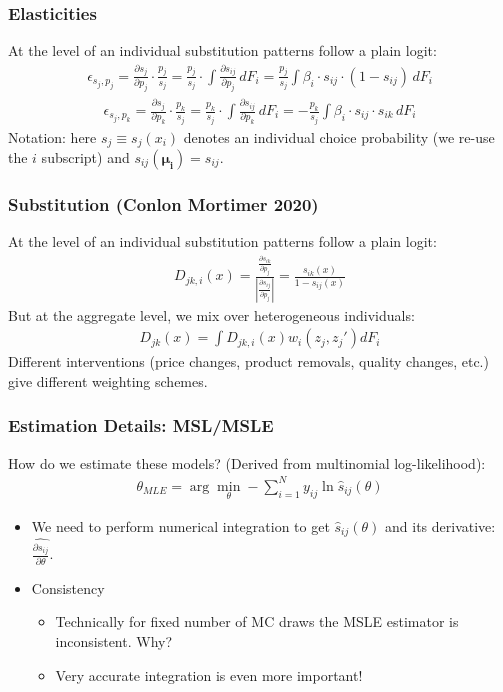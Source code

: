 \documentclass[xcolor=pdftex,dvipsnames,table,mathserif,aspectratio=169]{beamer}
\begin{document}
\begin{frame}
\frametitle{Elasticities}
At the level of an individual substitution patterns follow a plain logit:
\begin{align*}
\epsilon_{s_j,p_j} = \frac{\partial s_{j}}{\partial p_j} \cdot \frac{p_j}{s_{j}}
=\frac{p_j}{s_{j}}  \cdot \int \frac{\partial s_{ij}}{\partial p_j}  \, d F_i 
= \frac{p_j}{s_{j}}  \int \beta_i \cdot s_{ij} \cdot (1-s_{ij} ) \,d F_i 
\end{align*}
\begin{align*}
\epsilon_{s_j,p_k} = \frac{\partial s_{j}}{\partial p_k} \cdot \frac{p_k}{s_{j}}
=\frac{p_k}{s_{j}}  \cdot \int \frac{\partial s_{ij}}{\partial p_k} \,  d F_i 
=- \frac{p_k}{s_{j}}  \int \beta_i \cdot s_{ij}\cdot s_{ik}\, d F_i 
\end{align*}
Notation: here $s_j \equiv s_j(x_i)$ denotes an individual choice probability (we re-use the $i$ subscript) and $s_{ij}(\boldsymbol{\mu_{i}})=s_{ij}$.
\end{frame}





\begin{frame}
\frametitle{Substitution (Conlon Mortimer 2020)}
At the level of an individual substitution patterns follow a plain logit:
\begin{align*}
D_{jk,i}(x) = \frac{\frac{\partial s_{ik}}{\partial p_j}}{\left| \frac{\partial s_{ij}}{\partial p_j} \right|} = \frac{s_{ik}(x)}{1-s_{ij}(x)}
\end{align*}
But at the aggregate level, we mix over heterogeneous individuals:
\begin{align*}
D_{jk}(x) = \int D_{jk,i}(x) w_i(z_j,z_j') d F_i
\end{align*}
Different interventions (price changes, product removals, quality changes, etc.) give different weighting schemes.
\end{frame}


\begin{frame}
\frametitle{Estimation Details: MSL/MSLE}
How do we estimate these models? (Derived from multinomial log-likelihood):
\begin{align*}
\theta_{MLE} = \arg \min_{\theta} - \sum_{i=1}^N y_{ij} \ln \widehat{s}_{ij}(\theta)
\end{align*}

\begin{itemize}
\item We need to perform numerical integration to get $\widehat{s}_{ij}(\theta)$ and its derivative: $\widehat{\frac{\partial s_{ij}}{\partial \theta}}$.
\item Consistency
\begin{itemize}
\item Technically for fixed number of MC draws the MSLE estimator is inconsistent. Why?
\item Very accurate integration is even more important!
\end{itemize}
\end{itemize}

\end{frame}
\end{document}

